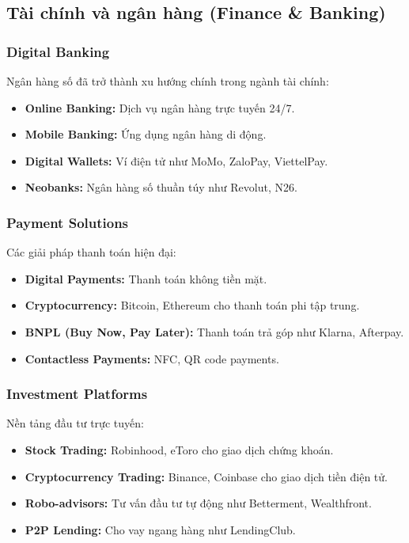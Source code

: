 \documentclass[a4paper,12pt]{report}
\begin{document}
\subsection{Tài chính và ngân hàng (Finance \& Banking)}

\subsubsection{Digital Banking}
Ngân hàng số đã trở thành xu hướng chính trong ngành tài chính:
\begin{itemize}
    \item \textbf{Online Banking:} Dịch vụ ngân hàng trực tuyến 24/7.
    \item \textbf{Mobile Banking:} Ứng dụng ngân hàng di động.
    \item \textbf{Digital Wallets:} Ví điện tử như MoMo, ZaloPay, ViettelPay.
    \item \textbf{Neobanks:} Ngân hàng số thuần túy như Revolut, N26.
\end{itemize}

\subsubsection{Payment Solutions}
Các giải pháp thanh toán hiện đại:
\begin{itemize}
    \item \textbf{Digital Payments:} Thanh toán không tiền mặt.
    \item \textbf{Cryptocurrency:} Bitcoin, Ethereum cho thanh toán phi tập trung.
    \item \textbf{BNPL (Buy Now, Pay Later):} Thanh toán trả góp như Klarna, Afterpay.
    \item \textbf{Contactless Payments:} NFC, QR code payments.
\end{itemize}

\subsubsection{Investment Platforms}
Nền tảng đầu tư trực tuyến:
\begin{itemize}
    \item \textbf{Stock Trading:} Robinhood, eToro cho giao dịch chứng khoán.
    \item \textbf{Cryptocurrency Trading:} Binance, Coinbase cho giao dịch tiền điện tử.
    \item \textbf{Robo-advisors:} Tư vấn đầu tư tự động như Betterment, Wealthfront.
    \item \textbf{P2P Lending:} Cho vay ngang hàng như LendingClub.
\end{itemize}
\end{document}
